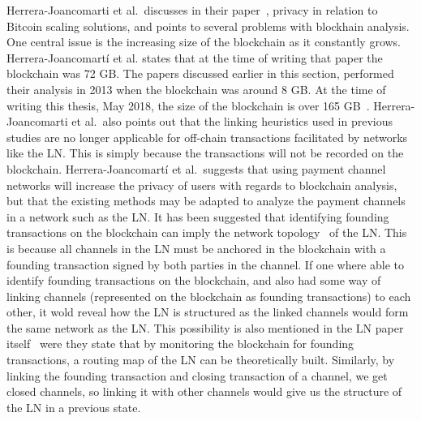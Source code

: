 Herrera-Joancomarti et al.~discusses in their paper~\cite{herrera2016privacy}, privacy in relation to Bitcoin scaling solutions, and points to several problems with blockhain analysis. One central issue is the increasing size of the blockchain as it constantly grows. Herrera-Joancomartí et al. states that at the time of writing that paper the blockchain was 72 GB. The papers discussed earlier in this section, performed their analysis in 2013 when the blockchain was around 8 GB. At the time of writing this thesis, May 2018, the size of the blockchain is over 165 GB~\cite{blockchain_size}.
Herrera-Joancomarti et al.~also points out that the linking heuristics used in previous studies are no longer applicable for off-chain transactions facilitated by networks like the LN. This is simply because the transactions will not be recorded on the blockchain. Herrera-Joancomartí et al.~suggests that using payment channel networks will increase the privacy of users with regards to blockchain analysis, but that the existing methods may be adapted to analyze the payment channels in a network such as the LN. 
It has been suggested that identifying founding transactions on the blockchain can imply the network topology~\cite{rusty_routing1} of the LN. This is because all channels in the LN must be anchored in the blockchain with a founding transaction signed by both parties in the channel. If one where able to identify founding transactions on the blockchain, and also had some way of linking channels (represented on the blockchain as founding transactions) to each other, it wold reveal how the LN is structured as the linked channels would form the same network as the LN. This possibility is also mentioned in the LN paper itself~\cite{poon2015bitcoin} were they state that by monitoring the blockchain for founding transactions, a routing map of the LN can be theoretically built.
Similarly, by linking the founding transaction and closing transaction of a channel, we get closed channels, so linking it with other channels would give us the structure of the LN in a previous state. 


